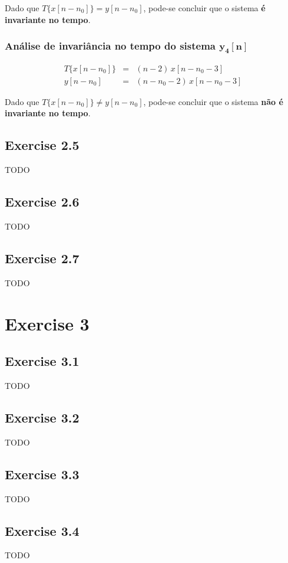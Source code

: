 \documentclass[a4paper]{article}
\begin{document}
\noindent Dado que $T\{x[n - n_{0}]\} = y[n - n_ {0}]$, pode-se concluir que o sistema \textbf{é invariante no tempo}.

\subsubsection{Análise de invariância no tempo do sistema $\mathbf{y_{4}[n]}$}
\begin{eqnarray}
	T\{x[n - n_{0}]\}	& = & (n - 2) \, x[n - n_{0} - 3] \\
	y[n - n_ {0}]		& = & (n - n_{0} - 2) \, x[n - n_{0} - 3]
\end{eqnarray}

\noindent Dado que $T\{x[n - n_{0}]\} \neq y[n - n_ {0}]$, pode-se concluir que o sistema \textbf{não é invariante no tempo}.

\subsection{Exercise 2.5}
\noindent TODO %

\subsection{Exercise 2.6}
\noindent TODO %

\subsection{Exercise 2.7}
\noindent TODO %

\section{Exercise 3}
\subsection{Exercise 3.1}
\noindent TODO %

\subsection{Exercise 3.2}
\noindent TODO %

\subsection{Exercise 3.3}
\noindent TODO %

\subsection{Exercise 3.4}
\noindent TODO %
\end{document}
